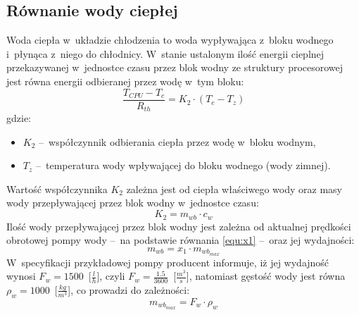 \subsection{Równanie wody ciepłej}
\indent

Woda ciepła w~układzie chłodzenia to woda wypływająca z~bloku wodnego
i~płynąca z~niego do chłodnicy. W~stanie ustalonym ilość energii cieplnej
przekazywanej w~jednostce czasu przez blok wodny ze struktury procesorowej jest
równa energii odbieranej przez wodę w~tym bloku:
\begin{equation}
    \frac{T_{CPU} - T_c}{R_{th}} = K_2 \cdot \left( T_c - T_z \right)
    \label{equ:hotwater}
\end{equation}
gdzie:
\begin{itemize}
    \item $K_2$ --~współczynnik odbierania ciepła przez wodę w~bloku wodnym,
    \item $T_z$ --~temperatura wody wpływającej do bloku wodnego (wody zimnej).
\end{itemize}

Wartość współczynnika $K_2$ zależna jest od ciepła właściwego wody oraz masy
wody przepływającej przez blok wodny w~jednostce czasu:
\begin{equation}
    K_2 = m_{wb} \cdot c_w
    \label{equ:k2}
\end{equation}
Ilość wody przepływającej przez blok wodny jest zależna od aktualnej prędkości
obrotowej pompy wody --~na podstawie równania \eqref{equ:x1} --~oraz jej
wydajności:
\begin{equation}
    m_{wb} = x_1 \cdot m_{wb_{max}}
    \label{equ:mwb}
\end{equation}
W~specyfikacji przykładowej pompy \cite{EKWBpump} producent informuje, iż jej
wydajność wynosi $F_w = 1500$~[$\frac{l}{h}$], czyli $F_w =
\frac{1.5}{3600}$~[$\frac{m^3}{s}$], natomiast gęstość wody jest równa $\rho_w
= 1000$~[$\frac{kg}{m^3}$], co prowadzi do zależności:
\begin{equation}
    m_{wb_{max}} = F_w \cdot \rho_w
    \label{equ:mwbmax}
\end{equation}

